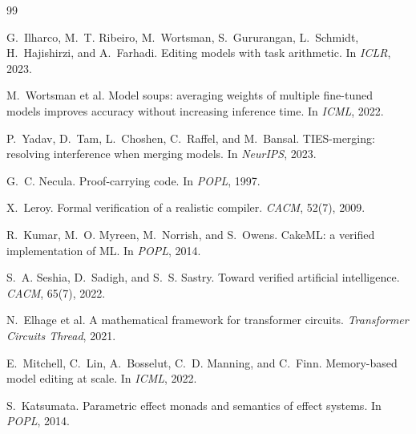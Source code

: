 \documentclass{article}
\begin{document}
\begin{thebibliography}{99}

G.~Ilharco, M.~T. Ribeiro, M.~Wortsman, S.~Gururangan, L.~Schmidt, H.~Hajishirzi,
  and A.~Farhadi.
\newblock Editing models with task arithmetic.
\newblock In \emph{ICLR}, 2023.

M.~Wortsman et al.
\newblock Model soups: averaging weights of multiple fine-tuned models improves
  accuracy without increasing inference time.
\newblock In \emph{ICML}, 2022.

P.~Yadav, D.~Tam, L.~Choshen, C.~Raffel, and M.~Bansal.
\newblock TIES-merging: resolving interference when merging models.
\newblock In \emph{NeurIPS}, 2023.

G.~C. Necula.
\newblock Proof-carrying code.
\newblock In \emph{POPL}, 1997.

X.~Leroy.
\newblock Formal verification of a realistic compiler.
\newblock \emph{CACM}, 52(7), 2009.

R.~Kumar, M.~O. Myreen, M.~Norrish, and S.~Owens.
\newblock CakeML: a verified implementation of ML.
\newblock In \emph{POPL}, 2014.

S.~A. Seshia, D.~Sadigh, and S.~S. Sastry.
\newblock Toward verified artificial intelligence.
\newblock \emph{CACM}, 65(7), 2022.

N.~Elhage et al.
\newblock A mathematical framework for transformer circuits.
\newblock \emph{Transformer Circuits Thread}, 2021.

E.~Mitchell, C.~Lin, A.~Bosselut, C.~D. Manning, and C.~Finn.
\newblock Memory-based model editing at scale.
\newblock In \emph{ICML}, 2022.

S.~Katsumata.
\newblock Parametric effect monads and semantics of effect systems.
\newblock In \emph{POPL}, 2014.

\end{thebibliography}
\end{document}
